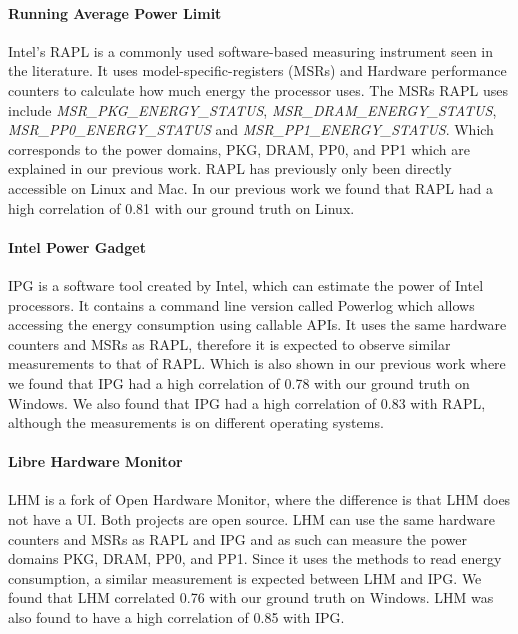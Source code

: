 \paragraph{Running Average Power Limit}
Intel's RAPL is a commonly used software-based measuring instrument seen in the literature.\cite{biksbois} It uses model-specific-registers (MSRs) and Hardware performance counters to calculate how much energy the processor uses. The MSRs RAPL uses include \textit{MSR\_PKG\_ENERGY\_STATUS}, \textit{MSR\_DRAM\_ENERGY\_STATUS}, \textit{MSR\_PP0\_ENERGY\_STATUS} and \textit{MSR\_PP1\_ENERGY\_STATUS}. Which corresponds to the power domains, PKG, DRAM, PP0, and PP1 which are explained in our previous work\cite{biksbois}. RAPL has previously only been directly accessible on Linux and Mac. In our previous work we found that RAPL had a high correlation of 0.81 with our ground truth on Linux.\cite{biksbois}

\paragraph{Intel Power Gadget}
IPG is a software tool created by Intel, which can estimate the power of Intel processors. It contains a command line version called Powerlog which allows accessing the energy consumption using callable APIs. It uses the same hardware counters and MSRs as RAPL\cite{FireFox}, therefore it is expected to observe similar measurements to that of RAPL. Which is also shown in our previous work where we found that IPG had a high correlation of 0.78 with our ground truth on Windows. We also found that IPG had a high correlation of 0.83 with RAPL, although the measurements is on different operating systems.\cite{biksbois}





\paragraph{Libre Hardware Monitor}
LHM is a fork of Open Hardware Monitor, where the difference is that LHM does not have a UI. Both projects are open source. LHM can use the same hardware counters and MSRs as RAPL and IPG and as such can measure the power domains PKG, DRAM, PP0, and PP1. Since it uses the methods to read energy consumption, a similar measurement is expected between LHM and IPG. We found that LHM correlated 0.76 with our ground truth on Windows. LHM was also found to have a high correlation of 0.85 with IPG.\cite{biksbois}

